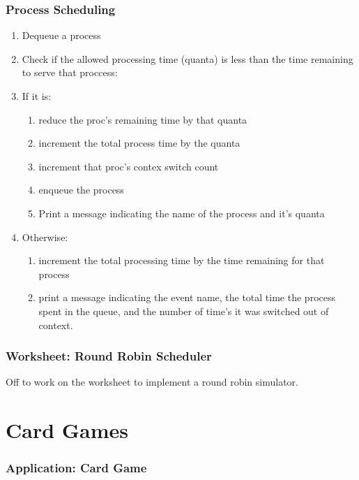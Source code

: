 \documentclass{beamer}
\begin{document}
\begin{frame}
    \frametitle{Process Scheduling}
    \begin{enumerate}
        \item Dequeue a process
        \item Check if the allowed processing time (quanta) is less than the time remaining to serve that proccess:
        \item If it is:
            \begin{enumerate}
                \item  reduce the proc's remaining time by that quanta
                \item  increment the total process time by the quanta
                \item  increment that proc's contex switch count
                \item  enqueue the process
                \item  Print a message indicating the name of the process and it's quanta
            \end{enumerate}
        \item  Otherwise:
            \begin{enumerate}
                \item  increment the total processing time by the time remaining for that process
                \item  print a message indicating the event name, the total time the process spent in the queue, and the number of time's it was switched out of context.
            \end{enumerate}
    \end{enumerate}
\end{frame}

\begin{frame}
    \frametitle{Worksheet: Round Robin Scheduler}
    \centering
    \vfill
    Off to work on the worksheet to implement a round robin simulator.
    \vfill
\end{frame}

\section{Card Games}
\begin{frame}
    \frametitle{Application: Card Game}
\end{frame}
\end{document}
